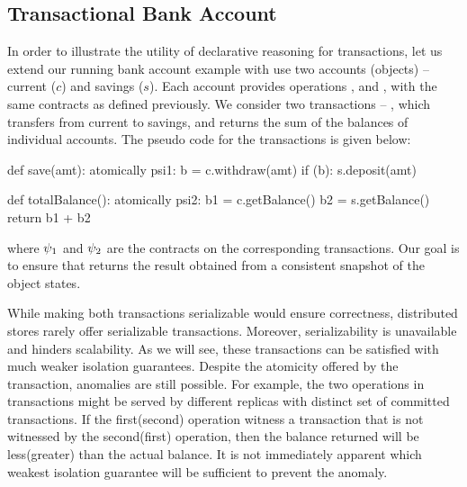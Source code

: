 \subsection{Transactional Bank Account}

In order to illustrate the utility of declarative reasoning for transactions,
let us extend our running bank account example with use two accounts (objects)
-- current ($c$) and savings ($s$). Each account provides operations
,  and , with the same contracts as
defined previously. We consider two transactions -- , which
transfers  from current to savings, and  returns
the sum of the balances of individual accounts. The pseudo code for the
transactions is given below:
\vspace{-1em}

\noindent \begin{minipage}[t]{0.5\columnwidth}
\begin{codepython}
def save(amt):
  atomically psi1:
    b = c.withdraw(amt)
    if (b): s.deposit(amt)
\end{codepython}
\end{minipage}
\begin{minipage}[t]{0.5\columnwidth}
\begin{codepython}
def totalBalance():
  atomically psi2:
    b1 = c.getBalance()
    b2 = s.getBalance()
    return b1 + b2
\end{codepython}
\end{minipage}

\noindent where $\psi_1$ and $\psi_2$ are the contracts on the corresponding
transactions. Our goal is to ensure that  returns the result
obtained from a consistent snapshot of the object states.

While making both transactions serializable would ensure correctness,
distributed stores rarely offer serializable transactions. Moreover,
serializability is unavailable and hinders scalability. As we will see, these
transactions can be satisfied with much weaker isolation guarantees. Despite
the atomicity offered by the transaction, anomalies are still possible. For
example, the two  operations in  transactions
might be served by different replicas with distinct set of committed 
transactions. If the first(second)  operation witness a
 transaction that is not witnessed by the second(first)
 operation, then the balance returned will be less(greater) than
the actual balance. It is not immediately apparent which weakest isolation
guarantee will be sufficient to prevent the anomaly.

